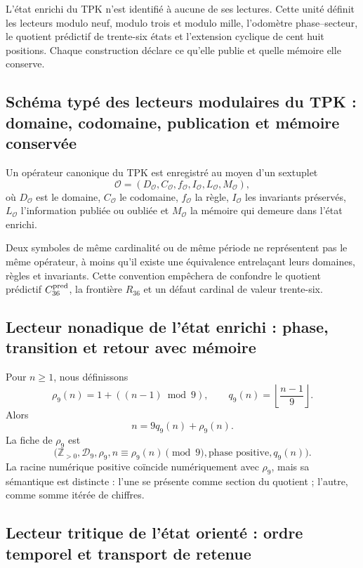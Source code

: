 L’état enrichi du TPK n’est identifié à aucune de ses lectures.
Cette unité définit les lecteurs modulo neuf, modulo trois et modulo mille,
l’odomètre phase--secteur, le quotient prédictif de trente-six états et
l’extension cyclique de cent huit positions. Chaque construction déclare ce qu’elle
publie et quelle mémoire elle conserve.

\subsection{Schéma typé des lecteurs modulaires du TPK : domaine, codomaine, publication et mémoire conservée}

\begin{definition}
\label{p12-83-c1-s13:def:tpk-ficha-operatoria}
Un opérateur canonique du TPK est enregistré au moyen d’un sextuplet
\[
 \mathcal O=(D_{\mathcal O},C_{\mathcal O},f_{\mathcal O},
 I_{\mathcal O},L_{\mathcal O},M_{\mathcal O}),
\]
où \(D_{\mathcal O}\) est le domaine, \(C_{\mathcal O}\) le codomaine,
\(f_{\mathcal O}\) la règle, \(I_{\mathcal O}\) les invariants préservés,
\(L_{\mathcal O}\) l’information publiée ou oubliée et
\(M_{\mathcal O}\) la mémoire qui demeure dans l’état enrichi.
\end{definition}

Deux symboles de même cardinalité ou de même période ne représentent pas le même
opérateur, à moins qu’il existe une équivalence entrelaçant leurs domaines,
règles et invariants. Cette convention empêchera de confondre le quotient
prédictif \(C_{36}^{\rm pred}\), la frontière \(R_{36}\) et un défaut
cardinal de valeur trente-six.

\subsection{Lecteur nonadique de l’état enrichi : phase, transition et retour avec mémoire}

Pour \(n\geq1\), nous définissons
\[
 \rho_9(n)=1+((n-1)\bmod9),
 \qquad
 q_9(n)=\left\lfloor\frac{n-1}{9}\right\rfloor.
\]
Alors
\[
 n=9q_9(n)+\rho_9(n).
\]
La fiche de \(\rho_9\) est
\[
 \bigl(
 \mathbb Z_{>0},\mathcal D_9,\rho_9,
 n\equiv\rho_9(n)\pmod9,
 \text{phase positive},
 q_9(n)
 \bigr).
\]
La racine numérique positive coïncide numériquement avec \(\rho_9\), mais sa
sémantique est distincte : l’une se présente comme section du quotient ; l’autre,
comme somme itérée de chiffres.

\subsection{Lecteur tritique de l’état orienté : ordre temporel et transport de retenue}

